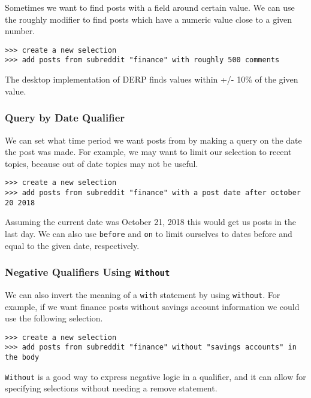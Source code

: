 Sometimes we want to find posts with a field around certain value. We can use the roughly modifier to find posts which have a numeric value close to a given number.
\newline\begin{minipage}{\linewidth}\begin{lstlisting}
>>> create a new selection
>>> add posts from subreddit "finance" with roughly 500 comments
\end{lstlisting}\end{minipage}
The desktop implementation of DERP finds values within +/- 10\% of the given value.


\subsubsection{Query by Date Qualifier}
We can set what time period we want posts from by making a query on the date the post was made. For example, we may want to limit our selection to recent topics, because out of date topics may not be useful.
\newline\begin{minipage}{\linewidth}\begin{lstlisting}
>>> create a new selection
>>> add posts from subreddit "finance" with a post date after october 20 2018
\end{lstlisting}\end{minipage}
Assuming the current date was October 21, 2018 this would get us posts in the last day. We can also use \texttt{before} and \texttt{on} to limit ourselves to dates before and equal to the given date, respectively.



\subsubsection{Negative Qualifiers Using \texttt{Without}}
We can also invert the meaning of a \texttt{with} statement by using \texttt{without}. For example, if we want finance posts without savings account information we could use the following selection.
\newline\begin{minipage}{\linewidth}\begin{lstlisting}
>>> create a new selection
>>> add posts from subreddit "finance" without "savings accounts" in the body
\end{lstlisting}\end{minipage}
\texttt{Without} is a good way to express negative logic in a qualifier, and it can allow for specifying selections without needing a remove statement.


